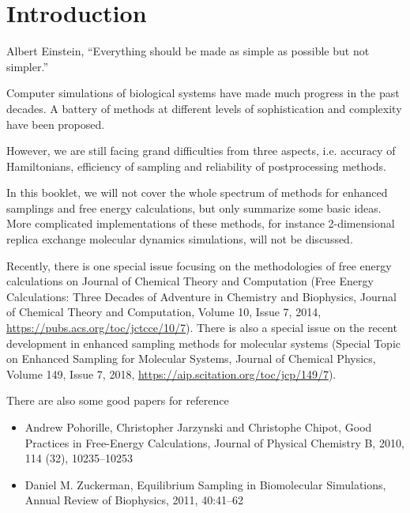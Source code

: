 \chapter{Introduction\label{chapter:introduction}}

\begin{chapquote}{Albert Einstein, %
	}
``Everything should be made as simple as possible but not simpler.''
\end{chapquote}

Computer simulations of biological systems have made much progress in the past decades. A battery of methods at different levels of sophistication and complexity have been proposed.

However, we are still facing grand difficulties from three aspects, i.e. accuracy of Hamiltonians, efficiency of sampling and reliability of postprocessing methods.\cite{NielsJCTC2014}

In this booklet, we will not cover the whole spectrum of methods for enhanced samplings and free energy calculations, but only summarize some basic ideas. 
More complicated implementations of these methods, for instance 2-dimensional replica exchange molecular dynamics simulations, will not be discussed.

Recently, there is one special issue focusing on the methodologies of free energy calculations on Journal of Chemical Theory and Computation (Free Energy Calculations: Three Decades of Adventure in Chemistry and Biophysics, Journal of Chemical Theory and Computation, Volume 10, Issue 7, 2014, \url{https://pubs.acs.org/toc/jctcce/10/7}). There is also a special issue on the recent development in enhanced sampling methods for molecular systems (Special Topic on Enhanced Sampling for Molecular Systems, Journal of Chemical Physics, Volume 149, Issue 7, 2018, \url{https://aip.scitation.org/toc/jcp/149/7}). 

There are also some good papers for reference
\begin{itemize}
	\item Andrew Pohorille, Christopher Jarzynski and Christophe Chipot, Good Practices in Free-Energy Calculations, Journal of Physical Chemistry B, 2010, 114 (32), 10235–10253
	\item Daniel M. Zuckerman, Equilibrium Sampling in Biomolecular Simulations, Annual Review of Biophysics, 2011, 40:41–62
\end{itemize}


